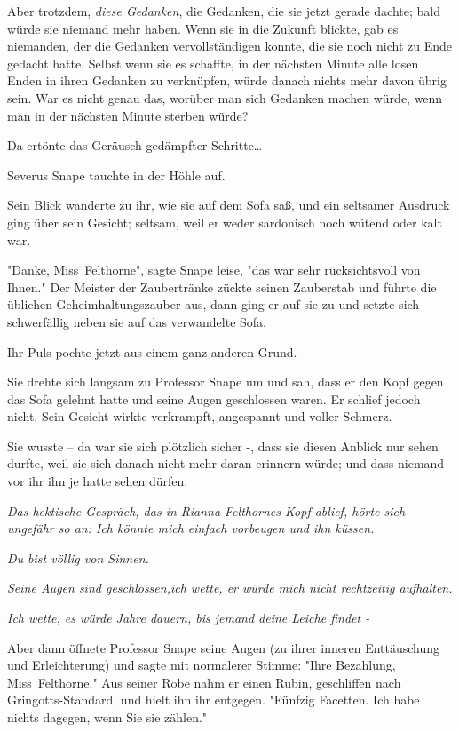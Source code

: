 {Aber trotzdem, \emph{diese Gedanken}, die Gedanken, die sie jetzt gerade dachte; bald würde sie niemand mehr haben. Wenn sie in die Zukunft blickte, gab es niemanden, der die Gedanken vervollständigen konnte, die sie noch nicht zu Ende gedacht hatte. Selbst wenn sie es schaffte, in der nächsten Minute alle losen Enden in ihren Gedanken zu verknüpfen, würde danach nichts mehr davon übrig sein. War es nicht genau das, worüber man sich Gedanken machen würde, wenn man in der nächsten Minute sterben würde?

Da ertönte das Geräusch gedämpfter Schritte…

Severus Snape tauchte in der Höhle auf.

Sein Blick wanderte zu ihr, wie sie auf dem Sofa saß, und ein seltsamer Ausdruck ging über sein Gesicht; seltsam, weil er weder sardonisch noch wütend oder kalt war.

"Danke, Miss~Felthorne", sagte Snape leise, "das war sehr rücksichtsvoll von Ihnen." Der Meister der Zaubertränke zückte seinen Zauberstab und führte die üblichen Geheimhaltungszauber aus, dann ging er auf sie zu und setzte sich schwerfällig neben sie auf das verwandelte Sofa.

Ihr Puls pochte jetzt aus einem ganz anderen Grund.

Sie drehte sich langsam zu Professor Snape um und sah, dass er den Kopf gegen das Sofa gelehnt hatte und seine Augen geschlossen waren. Er schlief jedoch nicht. Sein Gesicht wirkte verkrampft, angespannt und voller Schmerz.

Sie wusste -- da war sie sich plötzlich sicher -, dass sie diesen Anblick nur sehen durfte, weil sie sich danach nicht mehr daran erinnern würde; und dass niemand vor ihr ihn je hatte sehen dürfen.

\emph{Das hektische Gespräch, das in Rianna Felthornes Kopf ablief, hörte sich ungefähr so an: \emph{Ich könnte mich einfach vorbeugen und ihn küssen.}}

\emph{\emph{Du bist völlig von Sinnen.}}

\emph{\emph{Seine Augen sind geschlossen,ich wette, er würde mich nicht rechtzeitig aufhalten.}}

\emph{Ich wette, es würde Jahre dauern, bis jemand deine Leiche findet -}

Aber dann öffnete Professor Snape seine Augen (zu ihrer inneren Enttäuschung und Erleichterung) und sagte mit normalerer Stimme: "Ihre Bezahlung, Miss~Felthorne." Aus seiner Robe nahm er einen Rubin, geschliffen nach Gringotts-Standard, und hielt ihn ihr entgegen. "Fünfzig Facetten. Ich habe nichts dagegen, wenn Sie sie zählen."

}
